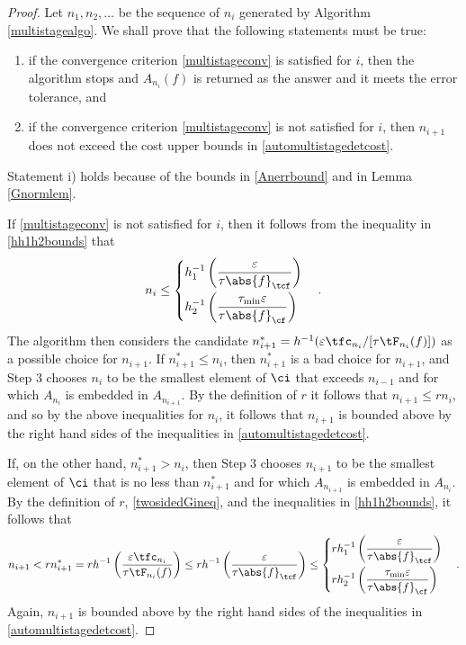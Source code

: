 \documentclass[]{elsarticle}
\theoremstyle{definition}
\theoremstyle{remark}
\newcommand{\Fnorm}[1]{\abs{#1}_{\cf}}
\newcommand{\Ftnorm}[1]{\abs{#1}_{\tcf}}
\begin{document}
\begin{proof} Let $n_1, n_2, \ldots$ be the sequence of $n_i$ generated by Algorithm \ref{multistagealgo}.  We shall prove that the following statements must be true:
\begin{enumerate}
\renewcommand{\labelenumi}{\roman{enumi})}
\item if the convergence criterion \eqref{multistageconv} is satisfied for $i$, then the algorithm stops and $A_{n_i}(f)$ is returned as the answer and it meets the error tolerance, and

\item if the convergence criterion \eqref{multistageconv} is not satisfied for $i$, then $n_{i+1}$ does not exceed the cost upper bounds in \eqref{automultistagedetcost}.

\end{enumerate}
Statement i) holds because of the bounds in \eqref{Anerrbound} and in Lemma \ref{Gnormlem}.

If \eqref{multistageconv} is not satisfied for $i$, then it follows from  the inequality in \eqref{hh1h2bounds} that 
\[
n_{i} \le 
\begin{cases} 
\displaystyle h_1^{-1}\left(\frac{\varepsilon}{\tau\Ftnorm{f}}\right) \\[2ex]
\displaystyle h_2^{-1}\left(\frac{\tau_{\min}\varepsilon}{\tau\Fnorm{f}}\right)
\end{cases} .
\] 
The algorithm then considers the candidate $n^*_{i+1} = h^{-1}(\varepsilon \tfc_{n_{i}}/[\tau \tF_{n_{i}}(f)])$ as a possible choice for $n_{i+1}$.  If $n^*_{i+1} \le n_{i}$, then $n^*_{i+1}$ is a bad choice for $n_{i+1}$, and Step 3 chooses $n_{i}$ to be the smallest element of $\ci$ that exceeds $n_{i-1}$ and for which $A_{n_{i}}$ is embedded in $A_{n_{i+1}}$.  By the definition of $r$ it follows that $n_{i+1} \le r  n_{i}$, and so by the above inequalities for $n_{i}$, it follows that $n_{i+1}$ is bounded above by the right hand sides of the inequalities in \eqref{automultistagedetcost}.

If, on the other hand, $n^*_{i+1} > n_{i}$, then Step 3 chooses $n_{i+1}$ to be the smallest element of $\ci$ that is no less than $n^*_{i+1}$ and for which $A_{n_{i+1}}$ is embedded in $A_{n_i}$.  By the definition of $r$, \eqref{twosidedGineq}, and the inequalities in \eqref{hh1h2bounds}, it follows that
\begin{equation*}
n_{i+1} < r n^*_{i+1} = r h^{-1}\left(\frac{\varepsilon \tfc_{n_{i}}}{\tau \tF_{n_{i}}(f)}\right) \le r  h^{-1}\left(\frac{\varepsilon}{\tau \Ftnorm{f}}\right) \le
\begin{cases}
\displaystyle  rh_1^{-1}\left(\frac{\varepsilon}{\tau \Ftnorm{f}} \right) \\[2ex]
\displaystyle rh_2^{-1}\left(\frac{\tau_{\min}\varepsilon}{\tau \Fnorm{f}} \right)
\end{cases}.
\end{equation*}
Again, $n_{i+1}$ is bounded above by the right hand sides of the inequalities in \eqref{automultistagedetcost}.


\end{proof}
\end{document}
